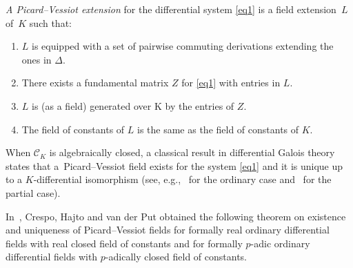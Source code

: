 \documentclass[pdftex]{sigma}%
\numberwithin{equation}{section}
\begin{document}
\begin{Definition}\label{PV}
\emph{A Picard--Vessiot extension} for the differential system \eqref{eq1}
is a field extension~$L$ of~$K$ such that:
\begin{enumerate}\itemsep=0pt
\item[$1.$] $L$ is equipped with a set of pairwise commuting derivations extending the ones in $\Delta$.
\item[$2.$] There exists a fundamental matrix $Z$ for \eqref{eq1} with entries in $L$.
\item[$3.$] $L$ is (as a field) generated over K by the entries of $Z$.
\item[$4.$] The field of constants of $L$ is the same as the field of constants of $K$.
\end{enumerate}
\end{Definition}

When $\mathcal{C}_K$ is algebraically closed, a classical result in differential Galois theory states that a~Picard--Vessiot field exists for the system \eqref{eq1} and it is unique up to a $K$-differential isomorphism (see, e.g.,~\cite[Theorems~5.6.5 and~5.6.9]{CHgsm} for the ordinary case and~\cite[Appendix~D]{PS} for the partial case).

In~\cite{CHP}, Crespo, Hajto and van der Put obtained the following theorem on existence and uniqueness of Picard--Vessiot fields for formally real ordinary differential fields with real closed field of constants and for formally $p$-adic ordinary differential fields with $p$-adically closed field of constants.
\end{document}

